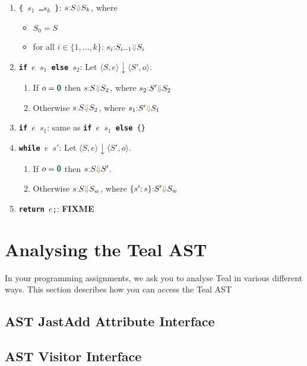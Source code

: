 \documentclass{article}
\newcommand{\tuple}[1]{\ensuremath{\langle #1 \rangle}}
\newcommand{\vterminal}[1]{\textsf{\textcolor{dgreen}{\texttt{#1}}}}
\newcommand{\Ckw}[1]{{\textsf{\textbf{#1}}}}
\newcommand{\Vint}[1]{{\textsf{\textcolor{dcyan}{\textbf{#1}}}}}
\newcommand{\SEVAL}[3]{#1\textcolor{dorange}{:} #2\textcolor{dorange}{\Downarrow}#3}
\begin{document}
\begin{enumerate}
\begin{enumerate}
    \item \vterminal{\{ $s_1$ \ldots $s_k$ \}}: $\SEVAL{s}{S}{S_k}$, where
      \begin{itemize}
        \item $S_0 = S$
        \item for all $i \in \{1, \ldots, k\}$: $\SEVAL{s_i}{S_{i-1}}{S_i}$
      \end{itemize}
    \item \vterminal{\Ckw{if} $e$ $s_1$ \Ckw{else} $s_2$}: Let $\tuple{S, e} \downarrow \tuple{S', o}$.
      \begin{enumerate}
        \item If $o = \Vint{0}$ then $\SEVAL{s}{S}{S_2}$, where $\SEVAL{s_2}{S'}{S_2}$
        \item Otherwise $\SEVAL{s}{S}{S_2}$, where $\SEVAL{s_1}{S'}{S_1}$
      \end{enumerate}
    \item \vterminal{\Ckw{if} $e$ $s_1$}: same as \vterminal{\Ckw{if} $e$ $s_1$ \Ckw{else} \{\}}
    \item \vterminal{\Ckw{while} $e$ $s'$}: Let $\tuple{S, e} \downarrow \tuple{S', o}$.
      \begin{enumerate}
        \item If $o = \Vint{0}$ then $\SEVAL{s}{S}{S'}$.
        \item Otherwise $\SEVAL{s}{S}{S_w}$, where $\SEVAL{\{ s'; s \}}{S'}{S_w}$
      \end{enumerate}
    \item \vterminal{\Ckw{return} $e$;}: \textbf{FIXME}
  \end{enumerate}
\end{enumerate}


\section{Analysing the Teal AST}
In your programming assignments, we ask you to analyse Teal in various different ways.
This section describes how you can access the Teal AST

\subsection{AST JastAdd Attribute Interface}

\subsection{AST Visitor Interface}
\end{document}
